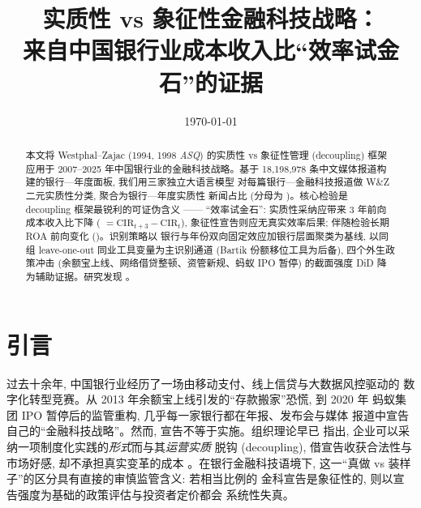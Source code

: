 




\title{实质性 vs 象征性金融科技战略：\\来自中国银行业成本收入比``效率试金石''的证据}
\author{}
\date{\today}


\maketitle

\begin{abstract}
本文将 Westphal--Zajac (1994, 1998 \emph{ASQ}) 的实质性 vs 象征性管理
(decoupling) 框架应用于 2007--2025 年中国银行业的金融科技战略。基于
18{,}198{,}978 条中文媒体报道构建的银行—年度面板, 我们用三家独立大语言模型
对每篇银行—金融科技报道做 W\&Z 二元实质性分类, 聚合为银行—年度实质性
新闻占比  (分母为 )。核心检验是
decoupling 框架最锐利的可证伪含义 —— ``效率试金石'': 实质性采纳应带来
3 年前向成本收入比下降 ( $=
\mathrm{CIR}_{t+3}-\mathrm{CIR}_{t}$), 象征性宣告则应无真实效率后果;
伴随检验长期 ROA 前向变化 ()。识别策略以
银行与年份双向固定效应加银行层面聚类为基线, 以同组 leave-one-out
同业工具变量为主识别通道 (Bartik 份额移位工具为后备), 四个外生政策冲击
(余额宝上线、网络借贷整顿、资管新规、蚂蚁 IPO 暂停) 的截面强度 DiD
降为辅助证据。研究发现 \@。
\end{abstract}

\section{引言}\label{sec:intro}

过去十余年, 中国银行业经历了一场由移动支付、线上信贷与大数据风控驱动的
数字化转型竞赛。从 2013 年余额宝上线引发的``存款搬家''恐慌, 到 2020 年
蚂蚁集团 IPO 暂停后的监管重构, 几乎每一家银行都在年报、发布会与媒体
报道中宣告自己的``金融科技战略''。然而, 宣告不等于实施。组织理论早已
指出, 企业可以采纳一项制度化实践的\emph{形式}而与其\emph{运营实质}
脱钩 (decoupling), 借宣告收获合法性与市场好感, 却不承担真实变革的成本
\parencite{westphal1998sym,westphal2001decoupling}。在银行金融科技语境下,
这一``真做 vs 装样子''的区分具有直接的审慎监管含义: 若相当比例的
金科宣告是象征性的, 则以宣告强度为基础的政策评估与投资者定价都会
系统性失真。

